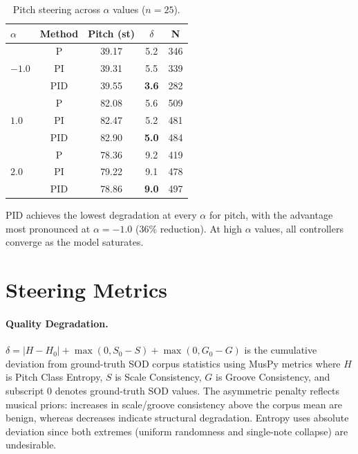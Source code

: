 \documentclass{article}
\theoremstyle{plain}
\begin{document}
\begin{table}[h]
  \caption{Pitch steering across $\alpha$ values ($n{=}25$).}
  \label{tab:alpha_pitch}
  \begin{center}
  \begin{small}
  \begin{tabular}{lcccc}
    \toprule
    $\alpha$ & Method & Pitch (st) & $\delta$ & N \\
    \midrule
    \multirow{3}{*}{$-1.0$} & P & 39.17 & 5.2 & 346 \\
    & PI & 39.31 & 5.5 & 339 \\
    & PID & 39.55 & \textbf{3.6} & 282 \\
    \midrule
    \multirow{3}{*}{$1.0$} & P & 82.08 & 5.6 & 509 \\
    & PI & 82.47 & 5.2 & 481 \\
    & PID & 82.90 & \textbf{5.0} & 484 \\
    \midrule
    \multirow{3}{*}{$2.0$} & P & 78.36 & 9.2 & 419 \\
    & PI & 79.22 & 9.1 & 478 \\
    & PID & 78.86 & \textbf{9.0} & 497 \\
    \bottomrule
  \end{tabular}
  \end{small}
  \end{center}
\end{table}

PID achieves the lowest degradation at every $\alpha$ for pitch, with the advantage most pronounced at $\alpha{=}{-}1.0$ (36\% reduction). At high $\alpha$ values, all controllers converge as the model saturates.

\section{Steering Metrics}
\label{app:metrics}

\paragraph{Quality Degradation.}
$\delta = |H - H_0| + \max(0, S_0 - S) + \max(0, G_0 - G)$ is the cumulative deviation from ground-truth SOD corpus statistics using MusPy metrics where $H$ is Pitch Class Entropy, $S$ is Scale Consistency, $G$ is Groove Consistency, and subscript 0 denotes ground-truth SOD values. The asymmetric penalty reflects musical priors: increases in scale/groove consistency above the corpus mean are benign, whereas decreases indicate structural degradation. Entropy uses absolute deviation since both extremes (uniform randomness and single-note collapse) are undesirable.
\end{document}

